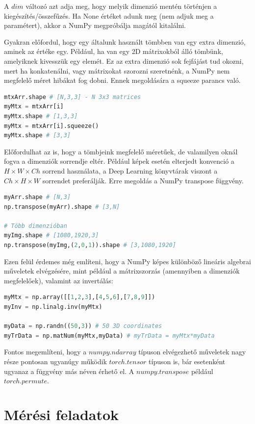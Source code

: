 \documentclass[12pt,a4paper,oneside]{report}             %
\begin{document}
A $dim$ változó azt adja meg, hogy melyik dimenzió mentén történjen a kiegészítés/összefűzés. Ha None értéket adunk meg (nem adjuk meg a paramétert), akkor a NumPy megpróbálja magától kitalálni.

Gyakran előfordul, hogy egy általunk használt tömbben van egy extra dimenzió, aminek az értéke egy. Például, ha van egy 2D mátrixokból álló tömbünk, amelyiknek kivesszük egy elemét. Ez az extra dimenzió sok fejfájást tud okozni, mert ha konkatenálni, vagy mátrixokat szorozni szeretnénk, a NumPy nem megfelelő méret hibákat fog dobni. Ennek megoldására a squeeze parancs való.

\begin{lstlisting}[language=Python]
mtxArr.shape # [N,3,3] - N 3x3 matrices
myMtx = mtxArr[i]
myMtx.shape # [1,3,3]
myMtx = mtxArr[i].squeeze()
myMtx.shape # [3,3]
\end{lstlisting}

Előfordulhat az is, hogy a tömbjeink megfelelő méretűek, de valamilyen oknál fogva a dimenziók sorrendje eltér. Például képek esetén elterjedt konvenció a $H\times W\times Ch$ sorrend használata, a Deep Learning könyvtárak viszont a $Ch\times H\times W$ sorrendet preferálják. Erre megoldás a NumPy transpose függvény.

\begin{lstlisting}[language=Python]
myArr.shape # [N,3]
np.transpose(myArr).shape # [3,N]

# Több dimenzióban
myImg.shape # [1080,1920,3]
np.transpose(myImg,(2,0,1)).shape # [3,1080,1920]
\end{lstlisting}

Ezen felül érdemes még említeni, hogy a NumPy képes különböző lineáris algebrai műveletek elvégzésére, mint például a mátrixszorzás (amennyiben a dimenziók megfelelőek), valamint az invertálás:

\begin{lstlisting}[language=Python]
myMtx = np.array([[1,2,3],[4,5,6],[7,8,9]])
myInv = np.linalg.inv(myMtx)

myData = np.randn((50,3)) # 50 3D coordinates
myTrData = np.matNum(myMtx,myData) # myTrData = myMtx*myData
\end{lstlisting}

Fontos megemlíteni, hogy a $numpy.ndarray$ típuson elvégezhető műveletek nagy része pontosan ugyanúgy működik $torch.tensor$ típuson is, bár esetenként ugyanaz a függvény más néven érhető el. A $numpy.transpose$ például $torch.permute$.

\chapter{Mérési feladatok}
\end{document}
